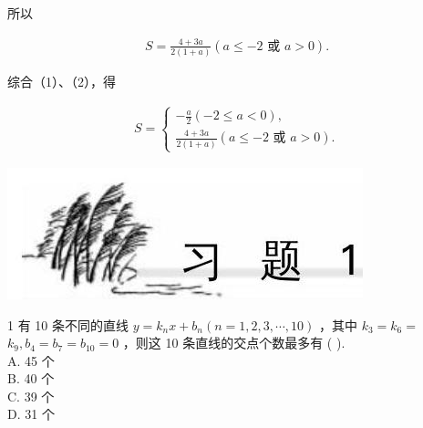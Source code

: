 \documentclass[10pt]{article}
\begin{document}
所以

\begin{align*}
S=\frac{4+3 a}{2(1+a)}(a \leqslant-2 \text { 或 } a>0) .
\end{align*}

综合（1）、（2），得

\begin{align*}
S=\left\{\begin{array}{l}
-\frac{a}{2}(-2 \leqslant a<0), \\
\frac{4+3 a}{2(1+a)}(a \leqslant-2 \text { 或 } a>0) .
\end{array}\right.
\end{align*}

\begin{center}
\includegraphics[max width=\textwidth]{2024_10_30_1bf34f7aeb61f11d11d3g-022}
\end{center}

1 有 10 条不同的直线 $y=k_{n} x+b_{n}(n=1,2,3, \cdots, 10)$ ，其中 $k_{3}=k_{6}=$ $k_{9}, b_{4}=b_{7}=b_{10}=0$ ，则这 10 条直线的交点个数最多有 ( ).\\
A. 45 个\\
B. 40 个\\
C. 39 个\\
D. 31 个
\end{document}
